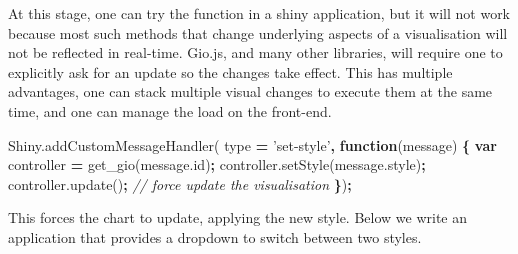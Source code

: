 \documentclass[10pt,]{krantz}
\makeatletter
\newenvironment{Shaded}{\begin{snugshade}}{\end{snugshade}}
\newcommand{\AttributeTok}[1]{\textcolor[rgb]{0.61,0.61,0.61}{#1}}
\newcommand{\CommentTok}[1]{\textcolor[rgb]{0.37,0.37,0.37}{\textit{#1}}}
\newcommand{\KeywordTok}[1]{\textcolor[rgb]{0.27,0.27,0.27}{\textbf{#1}}}
\newcommand{\NormalTok}[1]{#1}
\newcommand{\OperatorTok}[1]{\textcolor[rgb]{0.43,0.43,0.43}{\textbf{#1}}}
\newcommand{\StringTok}[1]{\textcolor[rgb]{0.5,0.5,0.5}{#1}}
\newcommand{\VariableTok}[1]{\textcolor[rgb]{0,0,0}{#1}}
\newenvironment{kframe}{%
\medskip{}
\setlength{\fboxsep}{.8em}
 \def\at@end@of@kframe{}%
 \ifinner\ifhmode%
  \def\at@end@of@kframe{\end{minipage}}%
  \begin{minipage}{\columnwidth}%
 \fi\fi%
 \def\FrameCommand##1{\hskip\@totalleftmargin \hskip-\fboxsep
 \colorbox{shadecolor}{##1}\hskip-\fboxsep
     \hskip-\linewidth \hskip-\@totalleftmargin \hskip\columnwidth}%
 \MakeFramed {\advance\hsize-\width
   \@totalleftmargin\z@ \linewidth\hsize
   \@setminipage}}%
 {\par\unskip\endMakeFramed%
 \at@end@of@kframe}
\renewenvironment{Shaded}{\begin{kframe}}{\end{kframe}}
\makeatother
\begin{document}
At this stage, one can try the function in a shiny application, but it will not work because most such methods that change underlying aspects of a visualisation will not be reflected in real-time. Gio.js, and many other libraries, will require one to explicitly ask for an update so the changes take effect. This has multiple advantages, one can stack multiple visual changes to execute them at the same time, and one can manage the load on the front-end.

\begin{Shaded}
\begin{Highlighting}[]
\VariableTok{Shiny}\NormalTok{.}\AttributeTok{addCustomMessageHandler}\NormalTok{(}
\NormalTok{  type }\OperatorTok{=} \StringTok{'set-style'}\OperatorTok{,} \KeywordTok{function}\NormalTok{(message) }\OperatorTok{\{}
    \KeywordTok{var}\NormalTok{ controller }\OperatorTok{=} \AttributeTok{get_gio}\NormalTok{(}\VariableTok{message}\NormalTok{.}\AttributeTok{id}\NormalTok{)}\OperatorTok{;}
    \VariableTok{controller}\NormalTok{.}\AttributeTok{setStyle}\NormalTok{(}\VariableTok{message}\NormalTok{.}\AttributeTok{style}\NormalTok{)}\OperatorTok{;}
    \VariableTok{controller}\NormalTok{.}\AttributeTok{update}\NormalTok{()}\OperatorTok{;} \CommentTok{// force update the visualisation}
\OperatorTok{\}}\NormalTok{)}\OperatorTok{;}
\end{Highlighting}
\end{Shaded}

This forces the chart to update, applying the new style. Below we write an application that provides a dropdown to switch between two styles.
\end{document}
